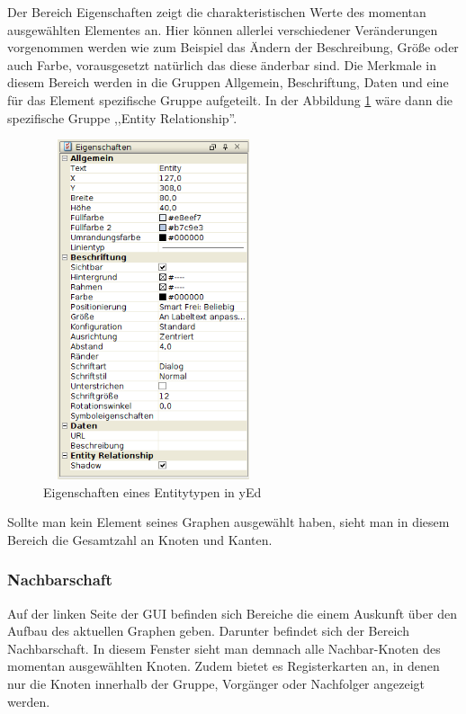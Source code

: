 \noindent
Der Bereich Eigenschaften zeigt die charakteristischen Werte des momentan ausgewählten Elementes an. Hier können allerlei verschiedener Veränderungen vorgenommen werden wie zum Beispiel das Ändern der Beschreibung, Größe oder auch Farbe, vorausgesetzt natürlich das diese änderbar sind. Die Merkmale in diesem Bereich werden in die Gruppen Allgemein, Beschriftung, Daten und eine für das Element spezifische Gruppe aufgeteilt. In der Abbildung \ref{yEdEigenschaften} wäre dann die spezifische Gruppe ,,Entity Relationship''.

\begin{figure}[!h]
	\begin{center}
		\includegraphics[width=6.5cm,height=10cm]{images/yed_eigenschaften.png}
		\caption{Eigenschaften eines Entitytypen in yEd}
		\label{yEdEigenschaften}
	\end{center}
\end{figure}

\noindent
Sollte man kein Element seines Graphen ausgewählt haben, sieht man in diesem Bereich die Gesamtzahl an Knoten und Kanten. 

\subsubsection{Nachbarschaft}

\noindent
Auf der linken Seite der GUI befinden sich Bereiche die einem Auskunft über den Aufbau des aktuellen Graphen geben. Darunter befindet sich der Bereich Nachbarschaft. In diesem Fenster sieht man demnach alle Nachbar-Knoten des momentan ausgewählten Knoten. Zudem bietet es Registerkarten an, in denen nur die Knoten innerhalb der Gruppe, Vorgänger oder Nachfolger angezeigt werden. 
\\

